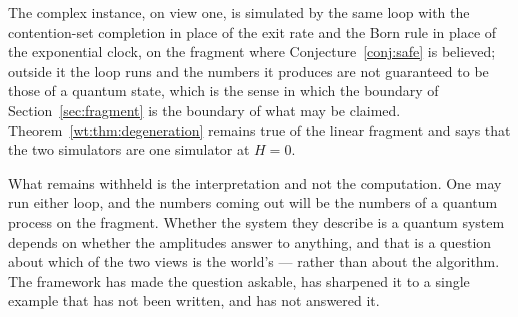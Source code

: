 The complex instance, on view one, is simulated by the same loop with the
contention-set completion in place of the exit rate and the Born rule in
place of the exponential clock, on the fragment where
Conjecture~\ref{conj:safe} is believed; outside it the loop runs and the
numbers it produces are not guaranteed to be those of a quantum state, which
is the sense in which the boundary of Section~\ref{sec:fragment} is the
boundary of what may be claimed.  Theorem~\ref{wt:thm:degeneration} remains
true of the linear fragment and says that the two simulators are one
simulator at $H = 0$.

What remains withheld is the interpretation and not the computation.  One
may run either loop, and the numbers coming out will be the numbers of a
quantum process on the fragment.  Whether the system they describe is a
quantum system depends on whether the amplitudes answer to anything, and
that is a question about which of the two views is the world's --- rather
than about the algorithm.  The framework has made the question askable, has
sharpened it to a single example that has not been written, and has not
answered it.

